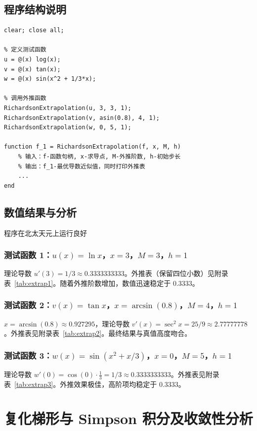 \documentclass[12pt,a4paper]{article}
\begin{document}
\subsection{程序结构说明}

\begin{lstlisting}[caption={hw6\_1.m 程序结构}, label={lst:code}]
clear; close all;

% 定义测试函数
u = @(x) log(x);
v = @(x) tan(x);
w = @(x) sin(x^2 + 1/3*x);

% 调用外推函数
RichardsonExtrapolation(u, 3, 3, 1);
RichardsonExtrapolation(v, asin(0.8), 4, 1);
RichardsonExtrapolation(w, 0, 5, 1);

function f_1 = RichardsonExtrapolation(f, x, M, h)
    % 输入：f-函数句柄, x-求导点, M-外推阶数, h-初始步长
    % 输出：f_1-最优导数近似值，同时打印外推表
    ...
end
\end{lstlisting}

\subsection{数值结果与分析}

程序在北太天元上运行良好

\subsubsection{测试函数 1：\(u(x)=\ln x\)，\(x=3\)，\(M=3\)，\(h=1\)}
理论导数 \(u'(3)=1/3\approx 0.3333333333\)。外推表（保留四位小数）见附录表~\ref{tab:extrap1}。随着外推阶数增加，数值迅速稳定于 \(0.3333\)。

\subsubsection{测试函数 2：\(v(x)=\tan x\)，\(x=\arcsin(0.8)\)，\(M=4\)，\(h=1\)}
\(x=\arcsin(0.8)\approx 0.927295\)，理论导数 \(v'(x)=\sec^2 x=25/9\approx 2.77777778\)。外推表见附录表~\ref{tab:extrap2}。最终结果与真值高度吻合。

\subsubsection{测试函数 3：\(w(x)=\sin(x^2+x/3)\)，\(x=0\)，\(M=5\)，\(h=1\)}
理论导数 \(w'(0)=\cos(0)\cdot\frac{1}{3}=1/3\approx 0.3333333333\)。外推表见附录表~\ref{tab:extrap3}。外推效果极佳，高阶项均稳定于 \(0.3333\)。


\section{复化梯形与 Simpson 积分及收敛性分析}
\end{document}

